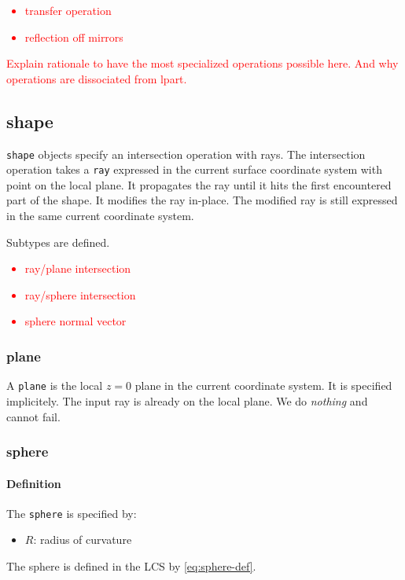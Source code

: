 \textcolor{red}{
\begin{itemize}
\item transfer operation
\item reflection off mirrors
\end{itemize}
Explain rationale to have the most specialized operations possible here.
And why operations are dissociated from lpart.}

\subsection{shape}
\lstinline{shape} objects specify an intersection operation with rays.
The intersection operation takes a \lstinline{ray} expressed in the current
surface coordinate system with point on the local plane. It propagates
the ray until it hits the first encountered part of the shape. It modifies
the ray in-place. The modified ray is still expressed in the same current
coordinate system.

Subtypes are defined.

\textcolor{red}{\begin{itemize}
\item ray/plane intersection
\item ray/sphere intersection
\item sphere normal vector
\end{itemize}}

\subsubsection{plane}
A \lstinline{plane} is the local $z=0$ plane in the current coordinate system.
It is specified implicitely.  The input ray is already on the local plane. We
do \emph{nothing} and cannot fail.

\subsubsection{sphere}

\paragraph{Definition}
The \lstinline{sphere} is specified by:

\begin{itemize}
\item $R$: radius of curvature
\end{itemize}

The sphere is defined in the \gls{LCS} by \cref{eq:sphere-def}.

